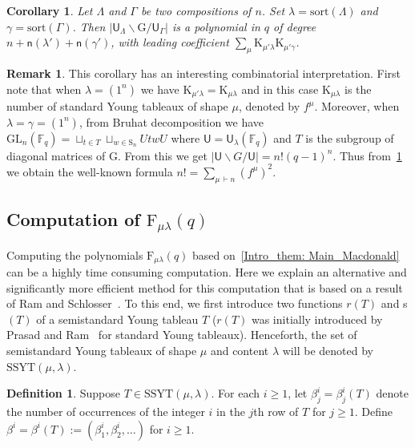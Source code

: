 \documentclass[12pt,a4paper,reqno]{amsart}
\theoremstyle{plain}
\newtheorem{corollary}[theorem]{Corollary}
\theoremstyle{definition}
\newtheorem{definition}[theorem]{Definition}
\newtheorem{remark}[theorem]{Remark}
\newcommand{\ssyt}{\mathrm{SSYT}}
\newcommand{\FF}{{\mathbb{F}}}
\newcommand{\1}{\mathds{1}}
\newcommand{\G}{{\mathrm{G}}}
\newcommand{\GL}{\mathrm{GL}}
\newcommand{\F}{\mathrm{F}}
\newcommand{\K}{{\mathrm{K}}}
\newcommand{\U}{\mathsf{U}}
\newcommand{\fn}{\mathsf{n}}
\begin{document}
\begin{corollary}\label{Cor:doublecoset} 
Let $\Lambda$ and $\Gamma$ be two compositions of $n$. Set $\lambda=\mathrm{sort}(\Lambda)$ and $\gamma=\mathrm{sort}(\Gamma)$.
Then 
$ |\U_\Lambda \backslash \G / \U_\Gamma|$ is a polynomial in $q$ of degree $n + \fn(\lambda') + \fn(\gamma')$, with leading coefficient 
$\sum_{\mu} \K_{\mu' \lambda} \K_{\mu' \gamma}$.
\end{corollary}



\begin{remark} This corollary has an interesting combinatorial interpretation. First note that when $\lambda=(1^n)$ we have $\K_{\mu'\lambda}=\K_{\mu\lambda}$ and in this case $\K_{\mu\lambda}$ is the number of standard Young tableaux of shape $\mu$, denoted by $f^\mu$. Moreover,  when $\lambda=\gamma=(1^n)$,  from Bruhat decomposition we have $\GL_n(\FF_q)= \sqcup_{t \in T} \sqcup_{w \in \mathrm{S}_n} U t w U$ 
where $\U=\U_\lambda(\FF_q)$ and $T$ is the subgroup of diagonal  matrices of $\G$. From this we get $|\U \backslash G / \U|=n!(q-1)^n$. Thus from~\cref{Cor:doublecoset} we obtain the well-known formula
$
n!=\sum_{\mu\, \vdash n} \left(f^\mu\right)^2
$.
\end{remark}

\subsection{Computation of $\F_{\mu\lambda}(q)$} 
Computing the polynomials $\F_{\mu\lambda}(q)$ based on~\cref{Intro_them: Main_Macdonald} can be a highly  time consuming computation. Here we explain an alternative and significantly more efficient method for this computation that is based on 
a result of 
Ram and Schlosser~\cite{Ram}. 
To this end, we first introduce two functions $r(T)$ and s$(T)$ of a semistandard Young tableau $T$ ($r(T)$ was  initially introduced by Prasad and Ram~\cite{Prasad} for standard Young tableaux).
Henceforth,  the set of semistandard Young tableaux of shape $\mu$ and content $\lambda$ will be denoted by $\ssyt(\mu,\lambda)$. 



\begin{definition}\label{def:bit}
Suppose $T\in \ssyt(\mu,\lambda)$. For each $i\geq 1$, let $\beta^i_{j}=\beta^i_j(T)$ denote the number of occurrences of the integer $i$ in the $j$th row of $T$ for $j\geq 1$. Define $\beta^i=\beta^i(T):=(\beta^i_{1},\beta^i_{2},\ldots)$ for $i\geq 1$. 
\end{definition}
\end{document}
